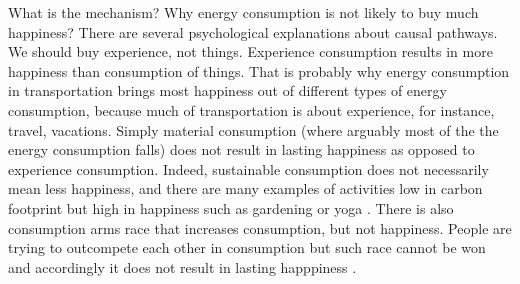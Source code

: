 \documentclass[10pt, letterpaper]{article}
\begin{document}
\begin{spacing}{1.4}
What is the mechanism? Why energy consumption is not likely to buy much
happiness?  There are several psychological explanations about causal pathways.
We should buy experience, not things. Experience consumption results in more
happiness than consumption of things. 
That is  probably why  energy
consumption in transportation brings most happiness out of different types of
energy consumption, because much of
transportation is about experience, for instance, travel, vacations. 
Simply material consumption (where arguably most of the  the energy consumption
falls) does not result in lasting happiness as opposed to experience
consumption. Indeed, sustainable consumption does not necessarily mean less
happiness, and there are many examples of activities low in carbon footprint but
high in happiness such as gardening or yoga \cite{madjar06}. There is also
consumption arms race that increases consumption, but not happiness. People are trying to outcompete each other in
consumption but such race cannot be won and accordingly it does not result in lasting
happpiness \cite{frank12}.%




\end{spacing}
\end{document}
